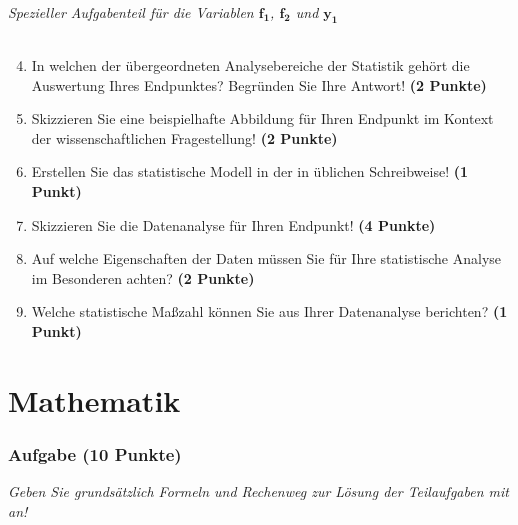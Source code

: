 \documentclass[a4paper, 9pt]{scrartcl}\usepackage[]{graphicx}\usepackage[]{xcolor}
\begin{document}
\paragraph{Spezieller Aufgabenteil für die Variablen $\boldsymbol{f_1}$, $\boldsymbol{f_2}$ und $\boldsymbol{y_1}$}

\begin{enumerate}
  \setcounter{enumi}{3}
  \item In welchen der übergeordneten Analysebereiche der Statistik gehört die Auswertung Ihres Endpunktes? Begründen Sie Ihre Antwort! \textbf{(2 Punkte)}
  \item Skizzieren Sie eine beispielhafte Abbildung für Ihren Endpunkt im Kontext der wissenschaftlichen Fragestellung! \textbf{(2 Punkte)}
  \item Erstellen Sie das statistische Modell in der in \Rlogo üblichen Schreibweise! \textbf{(1 Punkt)}
  \item Skizzieren Sie die Datenanalyse für Ihren Endpunkt! \textbf{(4 Punkte)}
  \item Auf welche Eigenschaften der Daten müssen Sie für Ihre statistische Analyse im Besonderen achten? \textbf{(2 Punkte)}
  \item Welche statistische Maßzahl können Sie aus Ihrer Datenanalyse berichten? \textbf{(1 Punkt)}
\end{enumerate}

 
\clearpage
\part{Mathematik}

\section{Aufgabe \hfill (10 Punkte)}

\textit{Geben Sie grundsätzlich Formeln und Rechenweg zur Lösung der Teilaufgaben mit an!} \\[1Ex]
 
\end{document}
